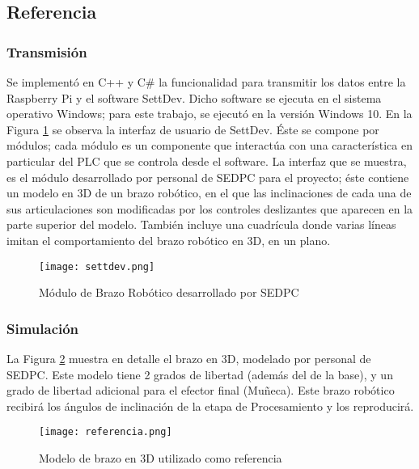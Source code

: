 \subsection{Referencia}

\subsubsection{Transmisión}

Se implementó en C++ y C\# la funcionalidad para transmitir los datos entre la Raspberry Pi y el software SettDev. Dicho software se ejecuta en el sistema operativo Windows; para este trabajo, se ejecutó en la versión Windows 10. En la Figura \ref{fig:settdev} se observa la interfaz de usuario de SettDev. Éste se compone por módulos; cada módulo es un componente que interactúa con una característica en particular del PLC que se controla desde el software. La interfaz que se muestra, es el módulo desarrollado por personal de SEDPC para el proyecto; éste contiene un modelo en 3D de un brazo robótico, en el que las inclinaciones de cada una de sus articulaciones son modificadas por los controles deslizantes que aparecen en la parte superior del modelo. También incluye una cuadrícula donde varias líneas imitan el comportamiento del brazo robótico en 3D, en un plano.

\begin{figure}[htb]
	\centering
	\texttt{[image: settdev.png]}
	\caption{Módulo de Brazo Robótico desarrollado por SEDPC}
	\label{fig:settdev}
\end{figure}

\subsubsection{Simulación}

La Figura \ref{fig:referencia} muestra en detalle el brazo en 3D, modelado por personal de SEDPC. Este modelo tiene 2 grados de libertad (además del de la base), y un grado de libertad adicional para el efector final (Muñeca). Este brazo robótico recibirá los ángulos de inclinación de la etapa de Procesamiento y los reproducirá.

\begin{figure}[htb]
	\centering
	\texttt{[image: referencia.png]}
	\caption{Modelo de brazo en 3D utilizado como referencia}
	\label{fig:referencia}
\end{figure}